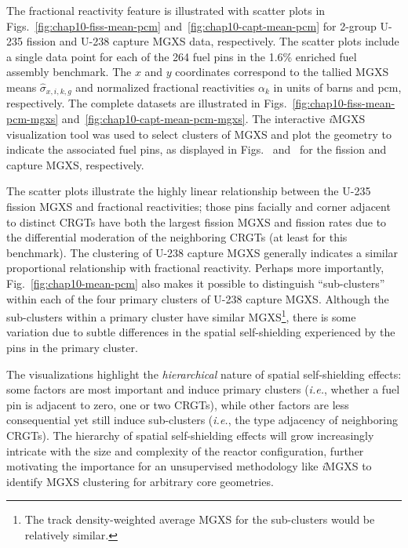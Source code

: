 The fractional reactivity feature is illustrated with scatter plots in Figs.~\ref{fig:chap10-fiss-mean-pcm} and~\ref{fig:chap10-capt-mean-pcm} for 2-group U-235 fission and U-238 capture \ac{MGXS} data, respectively. The scatter plots include a single data point for each of the 264 fuel pins in the 1.6\% enriched fuel assembly benchmark. The $x$ and $y$ coordinates correspond to the tallied \ac{MGXS} means $\hat{\sigma}_{x,i,k,g}$ and normalized fractional reactivities $\alpha_{k}$ in units of barns and \ac{pcm}, respectively. The complete datasets are illustrated in Figs.~\ref{fig:chap10-fiss-mean-pcm-mgxs} and~\ref{fig:chap10-capt-mean-pcm-mgxs}. The interactive \textit{i}\ac{MGXS} visualization tool was used to select clusters of \ac{MGXS} and plot the geometry to indicate the associated fuel pins, as displayed in Figs.~ and~ for the fission and capture \ac{MGXS}, respectively. 

The scatter plots illustrate the highly linear relationship between the U-235 fission \ac{MGXS} and fractional reactivities; those pins facially and corner adjacent to distinct \acp{CRGT} have both the largest fission \ac{MGXS} and fission rates due to the differential moderation of the neighboring \acp{CRGT} (at least for this benchmark). The clustering of U-238 capture \ac{MGXS} generally indicates a similar proportional relationship with fractional reactivity. Perhaps more importantly, Fig.~\ref{fig:chap10-mean-pcm} also makes it possible to distinguish ``sub-clusters'' within each of the four primary clusters of U-238 capture \ac{MGXS}. Although the sub-clusters within a primary cluster have similar \ac{MGXS}\footnote{The track density-weighted average \ac{MGXS} for the sub-clusters would be relatively similar.}, there is some variation due to subtle differences in the spatial self-shielding experienced by the pins in the primary cluster.

The visualizations highlight the \textit{hierarchical} nature of spatial self-shielding effects: some factors are most important and induce primary clusters (\textit{i.e.}, whether a fuel pin is adjacent to zero, one or two \acp{CRGT}), while other factors are less consequential yet still induce sub-clusters (\textit{i.e.}, the type adjacency of neighboring \acp{CRGT}). The hierarchy of spatial self-shielding effects will grow increasingly intricate with the size and complexity of the reactor configuration, further motivating the importance for an unsupervised methodology like \textit{i}\ac{MGXS} to identify \ac{MGXS} clustering for arbitrary core geometries.

